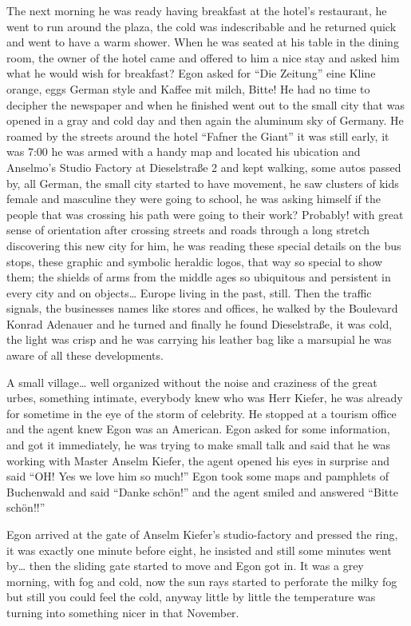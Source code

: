 \documentclass[smalldemyvopaper,11pt,twoside,onecolumn,openright,extrafontsizes]{memoir}
\begin{document}
The next morning he was ready having breakfast at the hotel’s restaurant, he went to run around the plaza, the cold was indescribable and he returned quick and went to have a warm shower. When he was seated at his table in the dining room, the owner of the hotel came and offered to him a nice stay and asked him what he would wish for breakfast? Egon asked for “Die Zeitung” eine Kline orange, eggs German style and Kaffee mit milch, Bitte! He had no time to decipher the newspaper and when he finished went out to the small city that was opened in a gray and cold day and then again the aluminum sky of Germany. He roamed by the streets around the hotel “Fafner the Giant” it was still early, it was 7:00 he was armed with a handy map and located his ubication and Anselmo’s Studio Factory at Dieselstraße 2 and kept walking, some autos passed by, all German, the small city started to have movement, he saw clusters of kids female and masculine they were going to school, he was asking himself if the people that was crossing his path were going to their work? Probably! with great sense of orientation after crossing streets and roads through a long stretch discovering this new city for him, he was reading these special details on the bus stops, these graphic and symbolic heraldic logos, that way so special to show them; the shields of arms from the middle ages so ubiquitous and persistent in every city and on objects… Europe living in the past, still. Then the traffic signals, the businesses names like stores and offices, he walked by the Boulevard Konrad Adenauer and he turned and finally he found Dieselstraße, it was cold, the light was crisp and he was carrying his leather bag like a marsupial he was aware of all these developments.

A small village… well organized without the noise and craziness of the great urbes, something intimate, everybody knew who was Herr Kiefer, he was already for sometime in the eye of the storm of celebrity. He stopped at a tourism office and the agent knew Egon was an American. Egon asked for some information, and got it immediately, he was trying to make small talk and said that he was working with Master Anselm Kiefer, the agent opened his eyes in surprise and said “OH! Yes we love him so much!”  Egon took some maps and pamphlets of Buchenwald and said “Danke schön!” and the agent smiled and answered “Bitte schön!!” 

Egon arrived at the gate of Anselm Kiefer’s studio-factory and pressed the ring, it was exactly one minute before eight, he insisted and still some minutes went by… then the sliding gate started to move and Egon got in. It was a grey morning, with fog and cold, now the sun rays started to perforate the milky fog but still you could feel the cold, anyway little by little the temperature was turning into something nicer in that November. 
\end{document}

